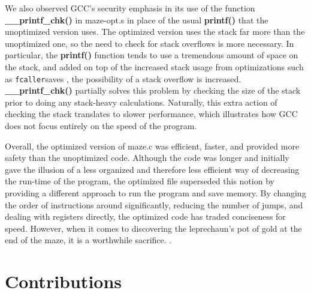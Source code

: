\documentclass[12pt,letterpaper]{article}
\begin{document}
We also observed GCC’s security emphasis in its use of the function 
{\bf \_\_printf\_chk()} in maze-opt.s in place of the usual {\bf printf()} 
that the unoptimized version uses. The optimized version uses the 
stack far more than the unoptimized one, so the need to check for 
stack overflows is more necessary. In particular, the {\bf printf()} 
function tends to use a tremendous amount of space on the stack, and 
added on top of the increased stack usage from optimizations such as 
\verb -fcaller-saves , the possibility of a stack overflow is increased. 
{\bf \_\_printf\_chk()} partially solves this problem by  checking the size 
of the stack prior to doing any stack-heavy calculations. Naturally, 
this extra action of checking the stack translates to slower performance, 
which illustrates how GCC does not focus entirely on the speed of the program.

Overall, the optimized version of maze.c was efficient, faster, and provided 
more safety than the unoptimized code. Although the code was longer and 
initially gave the illusion of a less organized and therefore less efficient 
way of decreasing the run-time of the program, the optimized file superseded 
this notion by providing a different approach to run the program and save memory.
By changing the order of instructions around significantly, reducing the number of 
jumps, and dealing with registers directly, the optimized code has traded conciseness 
for speed. However, when it comes to discovering the leprechaun’s pot of gold at 
the end of the maze, it is a worthwhile sacrifice. 
\newpage
\appendix .
\appendixpage
\section{Contributions}
\end{document}
